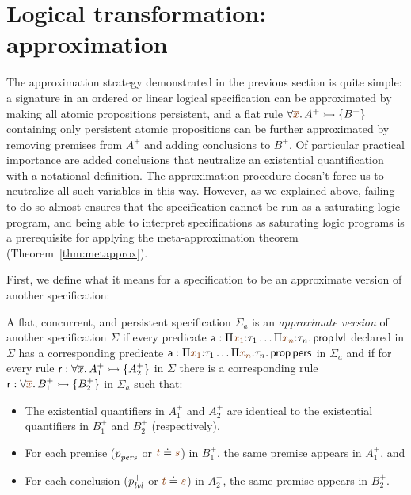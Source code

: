 \section{Logical transformation: approximation}
\label{sec:abstraction}

The approximation strategy demonstrated in the previous section is
quite simple: a signature in an ordered or linear logical
specification can be approximated by making all atomic propositions
persistent, and a flat rule $\forall \lf{\overline{x}}. \,A^+ \lefti
\{ B^+ \}$ containing only persistent atomic propositions can be
further approximated by removing premises from $A^+$ and adding
conclusions to $B^+$. Of particular practical importance are added
conclusions that neutralize an existential
quantification with a notational definition. The approximation procedure
doesn't force us to neutralize all such variables in this
way. However, as we explained above, failing to do so almost ensures
that the specification cannot be run as a saturating logic program,
and being able to interpret specifications as saturating logic
programs is a prerequisite for applying the meta-approximation theorem
(Theorem~\ref{thm:metapprox}).

First, we define what it means for a specification to be an approximate
version of another specification:

\bigskip
\begin{definition}\label{def:approxversion}
  A flat, concurrent, and persistent specification $\Sigma_a$ is an
  {\em approximate version} of another specification $\Sigma$ if every
  predicate ${\sf a} : \Pi \lf{x_1}{:}\tau_1 \ldots \Pi \lf{x_n}{:}\tau_n.\,
  {\sf prop}\,{\sf lvl}$ declared in $\Sigma$ has a corresponding
  predicate ${\sf a} : \Pi \lf{x_1}{:}\tau_1 \ldots \Pi \lf{x_n}{:}\tau_n.\,
  {\sf prop}\,{\sf pers}$ in $\Sigma_a$ and if for every rule ${\sf
    r} : \forall \overline{x}.\,A_1^+ \rightarrowtail \{ A_2^+ \}$ in $\Sigma$ there
  is a corresponding rule ${\sf r} : \forall \lf{\overline{x}}.\,B_1^+ \lefti
  \{ B_2^+ \}$ in $\Sigma_a$ such that:
  \begin{itemize}
  \item The existential quantifiers in $A_1^+$ and $A_2^+$ are
    identical to the existential quantifiers in $B_1^+$ and $B_2^+$
    (respectively),
  \item For each premise ($p^+_{\it pers}$ or $\lf{t} \doteq \lf{s}$) in $B^+_1$,
    the same premise appears in $A^+_1$, and 
  \item For each conclusion ($p^+_{\it lvl}$ or $\lf{t}
    \doteq \lf{s}$) in $A^+_2$, the same premise appears in $B^+_2$.
  \end{itemize}
\end{definition}
\bigskip


